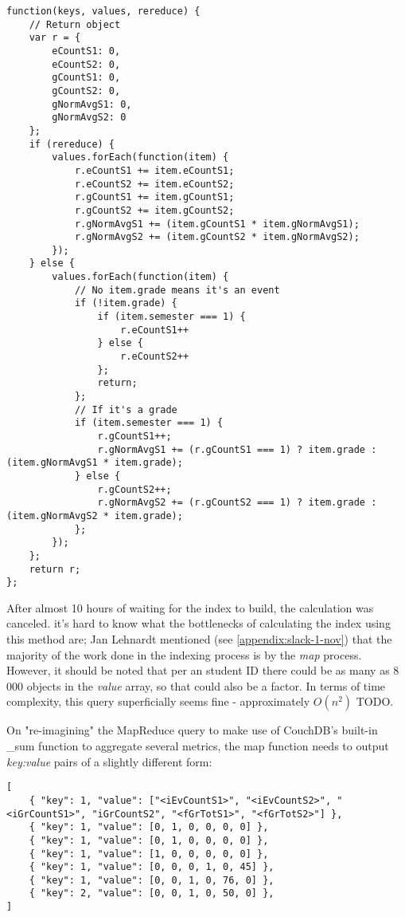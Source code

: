 \begin{verbatim}
function(keys, values, rereduce) {
    // Return object
    var r = {
        eCountS1: 0,
        eCountS2: 0,
        gCountS1: 0,
        gCountS2: 0,
        gNormAvgS1: 0,
        gNormAvgS2: 0
    };
    if (rereduce) {
        values.forEach(function(item) {
            r.eCountS1 += item.eCountS1;
            r.eCountS2 += item.eCountS2;
            r.gCountS1 += item.gCountS1;
            r.gCountS2 += item.gCountS2;
            r.gNormAvgS1 += (item.gCountS1 * item.gNormAvgS1);
            r.gNormAvgS2 += (item.gCountS2 * item.gNormAvgS2);
        });
    } else {
        values.forEach(function(item) {
            // No item.grade means it's an event
            if (!item.grade) {
                if (item.semester === 1) {
                    r.eCountS1++
                } else {
                    r.eCountS2++
                };
                return;
            };
            // If it's a grade
            if (item.semester === 1) {
                r.gCountS1++;
                r.gNormAvgS1 += (r.gCountS1 === 1) ? item.grade : (item.gNormAvgS1 * item.grade);
            } else {
                r.gCountS2++;
                r.gNormAvgS2 += (r.gCountS2 === 1) ? item.grade : (item.gNormAvgS2 * item.grade);
            };
        });
    };
    return r;
};
\end{verbatim}

After almost 10 hours of waiting for the index to build, the calculation was canceled. it's hard to know what the bottlenecks of calculating the index using this method are; Jan Lehnardt mentioned (see \ref{appendix:slack-1-nov}) that the majority of the work done in the indexing process is by the \textit{map} process. However, it should be noted that per an student ID there could be as many as 8 000 objects in the \textit{value} array, so that could also be a factor. In terms of time complexity, this query superficially seems fine - approximately  $ O(n^2) $ TODO.

On "re-imagining" the MapReduce query to make use of CouchDB's built-in \_sum function to aggregate several metrics, the map function needs to output \textit{key:value} pairs of a slightly different form:

\begin{verbatim}
[
    { "key": 1, "value": ["<iEvCountS1>", "<iEvCountS2>", "<iGrCountS1>", "iGrCountS2", "<fGrTotS1>", "<fGrTotS2>"] },
    { "key": 1, "value": [0, 1, 0, 0, 0, 0] },
    { "key": 1, "value": [0, 1, 0, 0, 0, 0] },
    { "key": 1, "value": [1, 0, 0, 0, 0, 0] },
    { "key": 1, "value": [0, 0, 0, 1, 0, 45] },
    { "key": 1, "value": [0, 0, 1, 0, 76, 0] },
    { "key": 2, "value": [0, 0, 1, 0, 50, 0] },
]
\end{verbatim}

